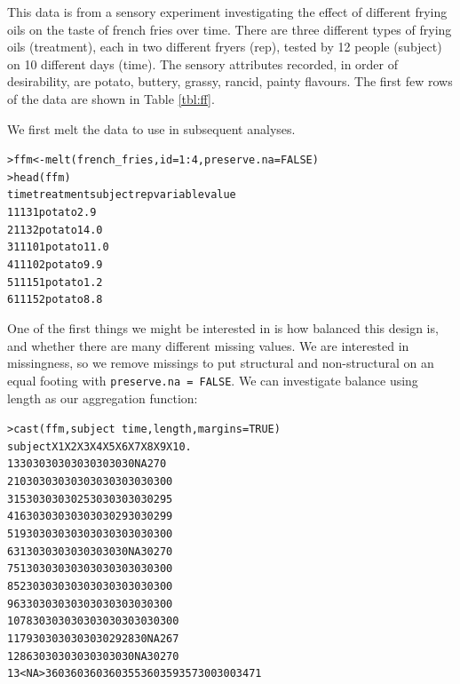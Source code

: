 \documentclass[oneside,letterpaper]{scrartcl}
\begin{document}
This data is from a sensory experiment investigating the effect of different frying oils on the taste of french fries over time.  There are three different types of frying oils (treatment), each in two different fryers (rep), tested by 12 people (subject) on 10 different days (time).  The sensory attributes recorded, in order of desirability, are potato, buttery, grassy, rancid, painty flavours.  The first few rows of the data are shown in Table \ref{tbl:ff}.


We first melt the data to use in subsequent analyses.  

\begin{alltt}
> ffm <- melt(french_fries, id = 1:4, preserve.na = FALSE)
> head(ffm)
  time treatment subject rep variable value
1    1         1       3   1   potato   2.9
2    1         1       3   2   potato  14.0
3    1         1      10   1   potato  11.0
4    1         1      10   2   potato   9.9
5    1         1      15   1   potato   1.2
6    1         1      15   2   potato   8.8

\end{alltt}

One of the first things we might be interested in is how balanced this design is, and whether there are many different missing values.  We are interested in missingness, so we remove missings to put structural and non-structural on an equal footing with {\tt preserve.na = FALSE}.   We can investigate balance using length as our aggregation function:

\begin{alltt}
> cast(ffm, subject ~ time, length, margins = TRUE)
   subject  X1  X2  X3  X4  X5  X6  X7  X8  X9 X10    .
1        3  30  30  30  30  30  30  30  30  30  NA  270
2       10  30  30  30  30  30  30  30  30  30  30  300
3       15  30  30  30  30  25  30  30  30  30  30  295
4       16  30  30  30  30  30  30  30  29  30  30  299
5       19  30  30  30  30  30  30  30  30  30  30  300
6       31  30  30  30  30  30  30  30  30  NA  30  270
7       51  30  30  30  30  30  30  30  30  30  30  300
8       52  30  30  30  30  30  30  30  30  30  30  300
9       63  30  30  30  30  30  30  30  30  30  30  300
10      78  30  30  30  30  30  30  30  30  30  30  300
11      79  30  30  30  30  30  30  29  28  30  NA  267
12      86  30  30  30  30  30  30  30  30  NA  30  270
13    <NA> 360 360 360 360 355 360 359 357 300 300 3471

\end{alltt}
\end{document}
